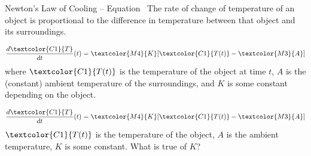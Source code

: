 \begin{frame}[t]
\begin{block}{Newton's Law of Cooling -- Equation~}
The rate of change of temperature of an object is proportional to the difference in temperature between that object and its surroundings.



\pause
\[\frac{d\textcolor{C1}{T}}{dt}(t) = \textcolor{M4}{K}[\textcolor{C1}{T(t)}-\textcolor{M3}{A}]\]
where $\textcolor{C1}{T(t)}$ is the temperature of the object at time $t$, \textcolor{M3}{$A$} is the (constant) ambient temperature of the surroundings, and \textcolor{M4}{$K$} is some constant depending on the object.
\end{block}
\end{frame}
\begin{frame}[t]
\AnswerSpace{}
\[\frac{d\textcolor{C1}{T}}{dt}(t) = \textcolor{M4}{K}[\textcolor{C1}{T(t)}-\textcolor{M3}{A}]\]
$\textcolor{C1}{T(t)}$ is the temperature of the object, \textcolor{M3}{$A$} is the ambient temperature, \textcolor{M4}{$K$} is some constant.
\vfill
What is true of $K$?
\end{frame}

